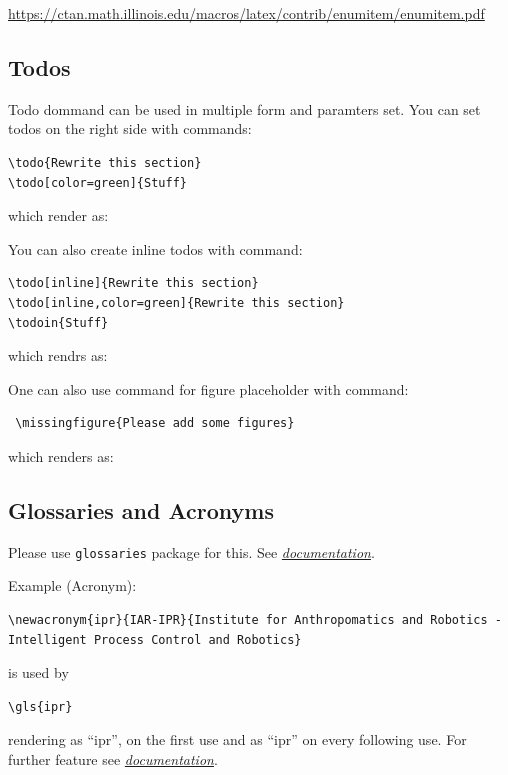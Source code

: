 \url{https://ctan.math.illinois.edu/macros/latex/contrib/enumitem/enumitem.pdf}

\subsection{Todos}

Todo dommand can be used in multiple form and paramters set. You can set todos on the right side with commands:
{\small
\begin{verbatim}
\todo{Rewrite this section}
\todo[color=green]{Stuff}
\end{verbatim}
} which render as:

You can also create inline todos with command:
{\small
\begin{verbatim}
\todo[inline]{Rewrite this section}
\todo[inline,color=green]{Rewrite this section}
\todoin{Stuff}
\end{verbatim}
} which rendrs as:

One can also use command for figure placeholder with command:
{\small
\begin{verbatim}
 \missingfigure{Please add some figures}
\end{verbatim}
} which renders as:


\subsection{Glossaries and Acronyms}
Please use \texttt{glossaries} package for this. See \href{https://en.wikibooks.org/wiki/LaTeX/Glossary}{\textit{documentation}}.

Example (Acronym):
{\small
\begin{verbatim}
\newacronym{ipr}{IAR-IPR}{Institute for Anthropomatics and Robotics - Intelligent Process Control and Robotics}
\end{verbatim}
} 
is used by
{\small
\begin{verbatim}
\gls{ipr}
\end{verbatim}
}
rendering as ``\gls{ipr}'', on the first use and as ``\gls{ipr}'' on every following use. For further feature see \href{https://en.wikibooks.org/wiki/LaTeX/Glossary}{\textit{documentation}}.

